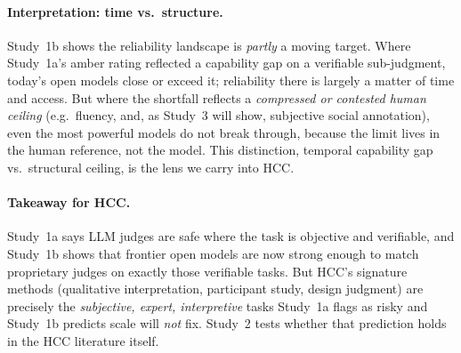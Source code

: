 \paragraph{Interpretation: time vs.\ structure.} Study~1b shows the reliability landscape is \emph{partly} a moving
target. Where Study~1a's amber rating reflected a capability gap on a verifiable sub-judgment, today's open models
close or exceed it; reliability there is largely a matter of time and access. But where the shortfall reflects a
\emph{compressed or contested human ceiling} (e.g.\ fluency, and, as Study~3 will show, subjective social annotation),
even the most powerful models do not break through, because the limit lives in the human reference, not the model.
This distinction, temporal capability gap vs.\ structural ceiling, is the lens we carry into HCC.

\paragraph{Takeaway for HCC.} Study~1a says LLM judges are safe where the task is objective and verifiable, and
Study~1b shows that frontier open models are now strong enough to match proprietary judges on exactly those
verifiable tasks. But HCC's signature methods (qualitative interpretation, participant study, design
judgment) are precisely the \emph{subjective, expert, interpretive} tasks Study~1a flags as risky and Study~1b
predicts scale will \emph{not} fix. Study~2 tests whether that prediction holds in the HCC literature itself.


